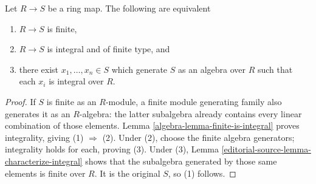 \begin{lemma}
\label{editorial-source-lemma-characterize-finite-in-terms-of-integral}
Let $R \to S$ be a ring map. The following are equivalent
\begin{enumerate}
\item $R \to S$ is finite,
\item $R \to S$ is integral and of finite type, and
\item there exist $x_1, \ldots, x_n \in S$ which generate $S$ as an
algebra over $R$ such that each $x_i$ is integral over $R$.
\end{enumerate}
\end{lemma}

\begin{proof}
If $S$ is finite as an $R$-module, a finite module generating
family also generates it as an $R$-algebra: the latter subalgebra
already contains every linear combination of those elements.
Lemma \ref{algebra-lemma-finite-is-integral} proves integrality, giving
(1) $\Rightarrow$ (2). Under (2), choose the finite algebra
generators; integrality holds for each, proving (3).
Under (3), Lemma \ref{editorial-source-lemma-characterize-integral} shows that the
subalgebra generated by those same elements is finite over $R$.
It is the original $S$, so (1) follows.
\end{proof}